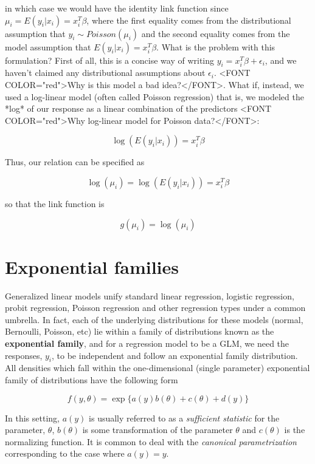 in which case we would have the identity link function since $\mu_i = E(y_i| x_i) = x_i^T\beta$, where the first equality comes from the distributional assumption that $y_i \sim Poisson(\mu_i)$ and the second equality comes from the model assumption that $E(y_i | x_i)  = x_i^T \beta$. What is the problem with this formulation? First of all, this is a concise way of writing $y_i = x_i^T \beta + \epsilon_i$, and we haven't claimed any distributional assumptions about $\epsilon_i$. <FONT COLOR="red">Why is this model a bad idea?</FONT>. What if, instead, we used a log-linear model (often called Poisson regression) that is, we modeled the *log* of our response as a linear combination of the predictors <FONT COLOR="red">Why log-linear model for Poisson data?</FONT>:


$$\log \left( E\left( y_i | x_i\right) \right) = x_i^T \beta$$

Thus, our relation can be specified as

$$\log(\mu_i) = \log(E(y_i | x_i)) = x_i^T \beta$$

so that the link function is

$$g(\mu_i) = \log(\mu_i)$$



\section{Exponential families}

Generalized linear models unify standard linear regression, logistic regression, probit regression, Poisson regression and other regression types under a common umbrella. In fact, each of the underlying distributions for these models (normal, Bernoulli, Poisson, etc) lie within a family of distributions known as the \textbf{exponential family}, and for a regression model to be a GLM, we need the responses, $y_i$, to be independent and follow an exponential family distribution. All densities which fall within the one-dimensional (single parameter) exponential family of distributions have the following form

$$f(y, \theta) = \exp\{a(y) b(\theta) + c(\theta) + d(y)\}$$

In this setting, $a(y)$ is usually referred to as a \textit{sufficient statistic} for the parameter, $\theta$, $b(\theta)$ is some transformation of the parameter $\theta$ and $c(\theta)$ is the normalizing function. It is common to deal with the \textit{canonical parametrization} corresponding to the case where $a(y) = y$.


